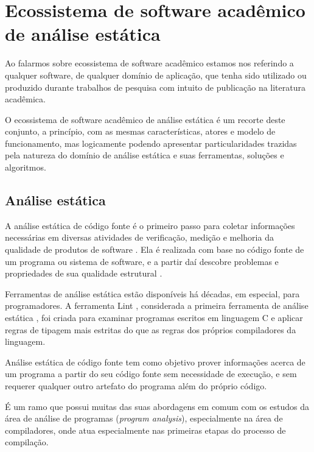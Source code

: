 \section{Ecossistema de software acadêmico de análise estática} \label{analise-estatica}

Ao falarmos sobre ecossistema de software acadêmico estamos nos referindo a
qualquer software, de qualquer domínio de aplicação, que tenha sido utilizado
ou produzido durante trabalhos de pesquisa com intuito de publicação na
literatura acadêmica.

O ecossistema de software acadêmico de análise estática é um recorte deste
conjunto, a princípio, com as mesmas características, atores e modelo de
funcionamento, mas logicamente podendo apresentar particularidades trazidas
pela natureza do domínio de análise estática e suas ferramentas, soluções e
algoritmos.

\subsection{Análise estática}

A análise estática de código fonte é o primeiro passo para coletar informações
necessárias em diversas atividades de verificação, medição e melhoria da
qualidade de produtos de software \cite{cruz2009code, kirkov2010source}. Ela é
realizada com base no código fonte de um programa ou sistema de software, e a
partir daí descobre problemas e propriedades de sua qualidade estrutural
\cite{chess2007secure}.

Ferramentas de análise estática estão disponíveis há décadas, em especial,
para programadores. A ferramenta Lint \cite{johnson1978lint}, considerada a
primeira ferramenta de análise estática \cite{gosain2015static}, foi criada para
examinar programas escritos em linguagem C e aplicar regras de tipagem mais
estritas do que as regras dos próprios compiladores da linguagem.

Análise estática de código fonte tem como objetivo prover
informações acerca de um programa a partir do seu código fonte sem
necessidade de execução, e sem requerer qualquer outro artefato do programa
além do próprio código.

É um ramo que possui muitas das suas abordagens em comum com os estudos da
área de análise de programas ({\it program analysis}), especialmente na área de
compiladores, onde atua especialmente nas primeiras etapas do processo de compilação.

